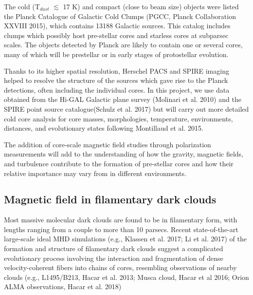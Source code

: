 \documentclass[11pt]{amsart}
\begin{document}
The cold (T$_{dust}$ $\lesssim$ 17 K) and compact (close to beam
size) objects were listed the Planck Catalogue of Galactic Cold Clumps (PGCC, Planck
Collaboration XXVIII 2015), which contains 13188 Galactic
sources. 
This  catalog includes clumps
which possibly host pre-stellar cores and starless cores at subparsec
scales. 
The objects detected by Planck are
likely to contain one or several cores, many of which will be prestellar
or in early stages of protostellar evolution. 

Thanks to its higher spatial resolution, 
Herschel PACS and SPIRE imaging
helped to resolve
the structure of the
sources which gave rise to the Planck detections, often including 
the individual cores. 
In this project, we use data obtained from the Hi-GAL Galactic
plane survey (Molinari et al. 2010) and the SPIRE point source catalogue(Schulz et al. 2017) but will carry out more detailed cold core analysis for 
core masses, morphologies, temperature, environments, distances, and evolutionary states following Montillaud et al. 2015.

The addition of core-scale magnetic field studies through polarization
measurements will add to the understanding of how the gravity, magnetic
fields, and turbulence contribute to the formation of pre-stellar cores and how their relative importance may vary from
in different environments.

\subsection{Magnetic field in filamentary dark clouds}

Most massive molecular dark clouds are found to be in filamentary form, with lengths ranging from a couple to more than 10 parsecs. 
Recent state-of-the-art large-scale ideal MHD simulations (e.g., Klassen et al. 2017; Li et al. 2017) of the formation and structure 
of filamentary dark clouds suggest a complicated evolutionary process involving the interaction and fragmentation of 
dense velocity-coherent fibers into chains of cores, resembling observations of nearby clouds (e.g., L1495/B213, Hacar et al. 2013; Musca cloud, Hacar et al 2016; 
Orion ALMA observations, Hacar et al. 2018)
\end{document}
